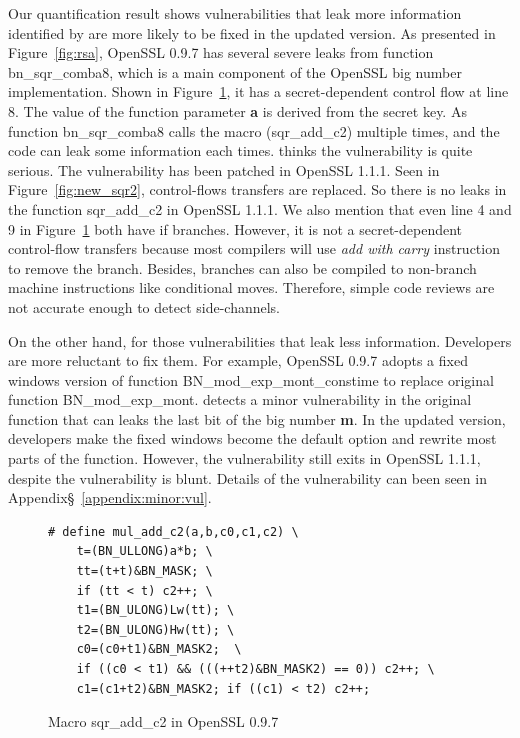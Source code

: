 Our quantification result shows vulnerabilities
that leak more information identified by \tool{} 
are more likely to be fixed in the updated version.
As presented in Figure~\ref{fig:rsa}, 
OpenSSL 0.9.7 has several severe leaks from
function \textsf{bn\_sqr\_comba8}, which is a main 
component of the OpenSSL big number implementation.
Shown in Figure~\ref{fig:old_sqr2}, it has a 
secret-dependent control flow at line 8.
The value of the function parameter \textbf{a} is derived from
the secret key. 
As function \textsf{bn\_sqr\_comba8}
calls the macro (\textsf{sqr\_add\_c2}) multiple times, 
and the code can leak some information each times.
\tool{} thinks the vulnerability is quite serious. 
The vulnerability has been patched in OpenSSL 1.1.1. Seen in 
Figure~\ref{fig:new_sqr2}, control-flows transfers are replaced. 
So there is no leaks in the function
\textsf{sqr\_add\_c2} in OpenSSL 1.1.1. We also mention
that even line 4 and 9 in Figure~\ref{fig:old_sqr2} both have if branches.
However, it is not a secret-dependent control-flow transfers because
most compilers will use \emph{add with carry} instruction to remove the branch.
Besides, branches can also be compiled to non-branch machine instructions 
like conditional moves. Therefore, simple code reviews are not accurate
enough to detect side-channels. 

On the other hand, for those vulnerabilities that leak less information. 
Developers are more reluctant to fix them. 
For example, OpenSSL 0.9.7 adopts a fixed windows version of 
function \textsf{BN\_mod\_exp\_mont\_constime} to replace original function
\textsf{BN\_mod\_exp\_mont}.
\tool{} detects a minor vulnerability in the original function that can
leaks the last bit of the big number \textbf{m}. In the updated version,
developers make the fixed windows become the default option and rewrite most parts of the 
function. However, the vulnerability still exits in OpenSSL 1.1.1,
despite the vulnerability is blunt. Details of the 
vulnerability can been seen in Appendix\S~\ref{appendix:minor:vul}.

\begin{figure}
    \centering
    \begin{lstlisting}[xleftmargin=.02\textwidth,xrightmargin=.01\textwidth]
# define mul_add_c2(a,b,c0,c1,c2) \
    t=(BN_ULLONG)a*b; \
    tt=(t+t)&BN_MASK; \
    if (tt < t) c2++; \
    t1=(BN_ULONG)Lw(tt); \
    t2=(BN_ULONG)Hw(tt); \
    c0=(c0+t1)&BN_MASK2;  \
    if ((c0 < t1) && (((++t2)&BN_MASK2) == 0)) c2++; \
    c1=(c1+t2)&BN_MASK2; if ((c1) < t2) c2++;
\end{lstlisting}
    \vspace*{-6pt}
    \caption{Macro \textsf{sqr\_add\_c2} in OpenSSL 0.9.7}
    \label{fig:old_sqr2}
    \vspace*{-6pt}
\end{figure}



